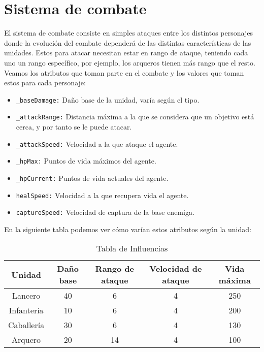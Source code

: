 \section{Sistema de combate}

El sistema de combate consiste en simples ataques entre los distintos personajes donde la evolución del combate dependerá de las distintas características de las unidades. Estos para atacar necesitan estar en rango de ataque, teniendo cada uno un rango específico, por ejemplo, los arqueros tienen más rango que el resto. Veamos los atributos que toman parte en el combate y los valores que toman estos para cada personaje:

\begin{itemize}
    \item \texttt{\_baseDamage:} Daño base de la unidad, varía según el tipo.
    \item \texttt{\_attackRange:} Distancia máxima a la que se considera que un objetivo está cerca, y por tanto se le puede atacar.
    \item \texttt{\_attackSpeed:} Velocidad a la que ataque el agente.
    \item \texttt{\_hpMax:} Puntos de vida máximos del agente.
    \item \texttt{\_hpCurrent:} Puntos de vida actuales del agente.
    \item \texttt{healSpeed:} Velocidad a la que recupera vida el agente.
    \item \texttt{captureSpeed:} Velocidad de captura de la base enemiga.
\end{itemize}

En la siguiente tabla podemos ver cómo varían estos atributos según la unidad:
\begin{table}[H]
    \centering
    \begin{tabular}{|c|c|c|c|c|}
       \hline        
       \textbf{Unidad} & Daño base & Rango de ataque & Velocidad de ataque & Vida máxima \\
        \hline
        Lancero & 40 & 6 & 4 & 250 \\
        \hline
        Infantería & 10 & 6 & 4 & 200 \\
        \hline
        Caballería & 30 & 6 & 4 & 130 \\
        \hline
        Arquero & 20 & 14 & 4 & 100 \\
        \hline
    \end{tabular}
    \caption{Tabla de Influencias}
\end{table}

